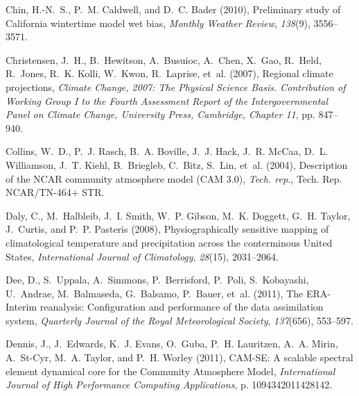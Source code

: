 \documentclass[draft,ms]{agutex}   %
\begin{document}
\begin{article}
\begin{thebibliography}{72}
Chin, H.-N.~S., P.~M. Caldwell, and D.~C. Bader (2010), {Preliminary study of
  California wintertime model wet bias}, \textit{Monthly Weather Review},
  \textit{138}(9), 3556--3571.

Christensen, J.~H., B.~Hewitson, A.~Busuioc, A.~Chen, X.~Gao, R.~Held,
  R.~Jones, R.~K. Kolli, W.~Kwon, R.~Laprise, et~al. (2007), Regional climate
  projections, \textit{Climate Change, 2007: The Physical Science Basis.
  Contribution of Working Group I to the Fourth Assessment Report of the
  Intergovernmental Panel on Climate Change, University Press, Cambridge,
  Chapter 11}, pp. 847--940.

Collins, W.~D., P.~J. Rasch, B.~A. Boville, J.~J. Hack, J.~R. McCaa, D.~L.
  Williamson, J.~T. Kiehl, B.~Briegleb, C.~Bitz, S.~Lin, et~al. (2004),
  {Description of the NCAR community atmosphere model (CAM 3.0)}, \textit{Tech.
  rep.}, Tech. Rep. NCAR/TN-464+ STR.

Daly, C., M.~Halbleib, J.~I. Smith, W.~P. Gibson, M.~K. Doggett, G.~H. Taylor,
  J.~Curtis, and P.~P. Pasteris (2008), {Physiographically sensitive mapping of
  climatological temperature and precipitation across the conterminous United
  States}, \textit{International Journal of Climatology}, \textit{28}(15),
  2031--2064.

Dee, D., S.~Uppala, A.~Simmons, P.~Berrisford, P.~Poli, S.~Kobayashi,
  U.~Andrae, M.~Balmaseda, G.~Balsamo, P.~Bauer, et~al. (2011), {The
  ERA-Interim reanalysis: Configuration and performance of the data
  assimilation system}, \textit{Quarterly Journal of the Royal Meteorological
  Society}, \textit{137}(656), 553--597.

Dennis, J., J.~Edwards, K.~J. Evans, O.~Guba, P.~H. Lauritzen, A.~A. Mirin,
  A.~St-Cyr, M.~A. Taylor, and P.~H. Worley (2011), {CAM-SE: A scalable
  spectral element dynamical core for the Community Atmosphere Model},
  \textit{International Journal of High Performance Computing Applications}, p.
  1094342011428142.


\end{thebibliography}
\end{article}
\end{document}
